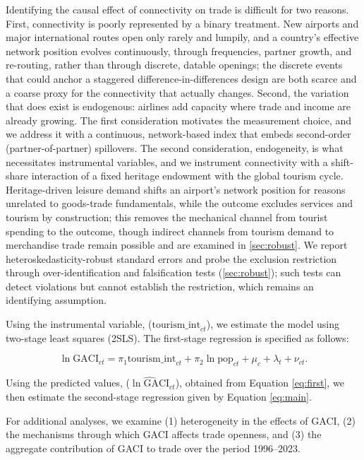 Identifying the causal effect of connectivity on trade is difficult for two
reasons. First, connectivity is poorly represented by a binary treatment. New
airports and major international routes open only rarely and lumpily, and a
country's effective network position evolves continuously, through
frequencies, partner growth, and re-routing, rather than through discrete,
datable openings; the discrete events that could anchor a staggered
difference-in-differences design are both scarce and a coarse proxy for the
connectivity that actually changes. Second, the variation that does exist is
endogenous: airlines add capacity where trade and income are already growing.
The first consideration motivates the measurement choice, and we address it
with a continuous, network-based index that embeds second-order
(partner-of-partner) spillovers. The second consideration, endogeneity, is
what necessitates instrumental variables, and we instrument connectivity with
a shift-share interaction
\citep{GoldsmithPinkham_2020,Borusyak_2022} of a fixed heritage endowment with
the global tourism cycle. Heritage-driven leisure demand shifts an airport's
network position for reasons unrelated to goods-trade fundamentals, while the
outcome excludes services and tourism by construction; this removes the
mechanical channel from tourist spending to the outcome, though indirect
channels from tourism demand to merchandise trade remain possible and are
examined in \ref{sec:robust}. We report
heteroskedasticity-robust standard errors and probe the exclusion restriction
through over-identification and falsification tests (\ref{sec:robust}); such
tests can detect violations but cannot establish the restriction, which
remains an identifying assumption.

Using the instrumental variable, ($\text{tourism\_int}_{ct}$), we estimate the model using two-stage least squares (2SLS). The first-stage regression is specified as follows:

\begin{equation}
\ln\mathrm{GACI}_{ct} = \pi_1\text{tourism\_int}_{ct} + \pi_2\ln\text{pop}_{ct} +  \mu_c + \lambda_t + \nu_{ct}.
  \label{eq:first}
  \end{equation}

Using the predicted values, ($\widehat{\ln\mathrm{GACI}}_{ct}$), obtained from Equation \eqref{eq:first}, we then estimate the second-stage regression given by Equation \eqref{eq:main}.

For additional analyses, we examine (1) heterogeneity in the effects of GACI, (2) the mechanisms through which GACI affects trade openness, and (3) the aggregate contribution of GACI to trade over the period 1996--2023.

